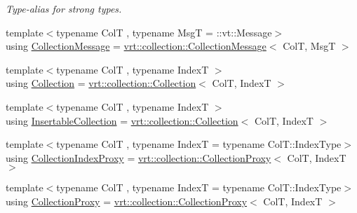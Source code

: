 \begin{DoxyCompactItemize}
\begin{DoxyCompactList}\small\item\em Type-\/alias for strong types. \end{DoxyCompactList}\item 
{\footnotesize template$<$typename ColT , typename MsgT  = \+::vt\+::\+Message$>$ }\\using \hyperlink{namespacevt_ae7700e12f79c0fec16964aab84838428}{Collection\+Message} = \hyperlink{structvt_1_1vrt_1_1collection_1_1_collection_message}{vrt\+::collection\+::\+Collection\+Message}$<$ ColT, MsgT $>$
\item 
{\footnotesize template$<$typename ColT , typename IndexT $>$ }\\using \hyperlink{namespacevt_ac72e048964e4bb536faaa8bc90f58db7}{Collection} = \hyperlink{structvt_1_1vrt_1_1collection_1_1_collection}{vrt\+::collection\+::\+Collection}$<$ ColT, IndexT $>$
\item 
{\footnotesize template$<$typename ColT , typename IndexT $>$ }\\using \hyperlink{namespacevt_a3fe0bbd9abf8f98d69d9f73c9f89e0a5}{Insertable\+Collection} = \hyperlink{structvt_1_1vrt_1_1collection_1_1_collection}{vrt\+::collection\+::\+Collection}$<$ ColT, IndexT $>$
\item 
{\footnotesize template$<$typename ColT , typename IndexT  = typename Col\+T\+::\+Index\+Type$>$ }\\using \hyperlink{namespacevt_a2be17f5dafb626fe9f58d762b6aad2f0}{Collection\+Index\+Proxy} = \hyperlink{structvt_1_1vrt_1_1collection_1_1_collection_proxy}{vrt\+::collection\+::\+Collection\+Proxy}$<$ ColT, IndexT $>$
\item 
{\footnotesize template$<$typename ColT , typename IndexT  = typename Col\+T\+::\+Index\+Type$>$ }\\using \hyperlink{namespacevt_a0d58a693bfb96e0ce5d145692a1a1f98}{Collection\+Proxy} = \hyperlink{structvt_1_1vrt_1_1collection_1_1_collection_proxy}{vrt\+::collection\+::\+Collection\+Proxy}$<$ ColT, IndexT $>$
\end{DoxyCompactItemize}
